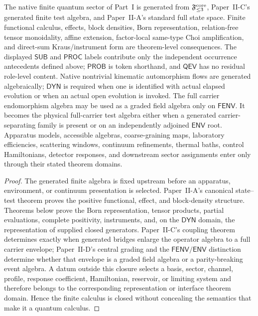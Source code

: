 \documentclass[12pt,a4paper]{article}
\begin{document}
\begin{theorem}
\label{p4:thm:no-hidden-interface-hypotheses}
The native finite quantum sector of Part~I is generated from
\(\mathfrak F_{\le3}^{\rm core}\), Paper~II-C's generated finite test algebra,
and Paper~II-A's standard full state space.  Finite functional calculus,
effects, block densities, Born representation, relation-free tensor
monoidality, affine extension, factor-local same-type Choi amplification, and direct-sum
Kraus/instrument form are theorem-level consequences.  The displayed
\(\mathsf{SUB}\) and \(\mathsf{PROC}\) labels contribute only the independent
occurrence antecedents defined above; \(\mathsf{PROB}\) is token shorthand,
and \(\mathsf{QEV}\) has no residual role-level content.  Native nontrivial
kinematic automorphism flows
are generated algebraically; \(\mathsf{DYN}\) is required when one is
identified with actual elapsed evolution or when an actual open evolution is
invoked.  The full carrier endomorphism algebra may be used as a graded field
algebra only on \(\mathsf{FENV}\).  It becomes the physical full-carrier test
algebra either when a generated carrier-separating family is present or on an
independently adjoined \(\mathsf{ENV}\) root.
Apparatus models, accessible algebras,
coarse-graining maps, laboratory efficiencies, scattering windows, continuum
refinements, thermal baths, control Hamiltonians, detector responses, and
downstream sector assignments enter only through their stated theorem
domains.
\end{theorem}

\begin{proof}
The generated finite algebra is fixed upstream before an apparatus,
environment, or continuum presentation is selected.  Paper~II-A's canonical
state--test theorem proves the positive functional, effect, and block-density
structure.  Theorems below prove the Born representation, tensor products,
partial evaluations, complete positivity, instruments, and, on the
\(\mathsf{DYN}\) domain, the representation of supplied closed generators.
Paper~II-C's coupling theorem determines exactly when generated bridges enlarge
the operator algebra to a full carrier envelope; Paper~II-D's central grading
and the \(\mathsf{FENV}/\mathsf{ENV}\) distinction determine whether that
envelope is a graded field algebra or a parity-breaking event algebra.  A datum
outside this closure selects a basis, sector, channel, profile, response
coefficient, Hamiltonian, reservoir, or limiting system and therefore belongs
to the corresponding representation or interface theorem domain.  Hence the
finite calculus is closed without concealing the semantics that make it a
quantum calculus.
\end{proof}
\end{document}
